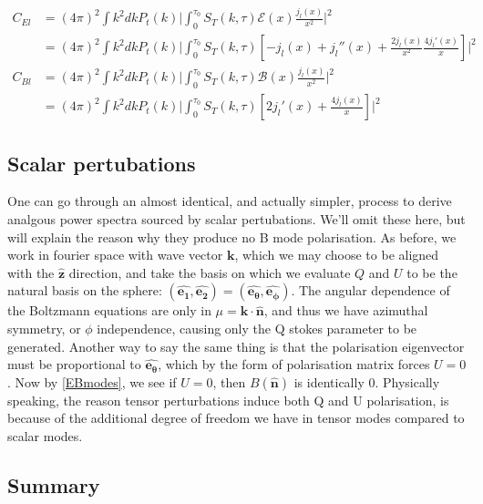 \documentclass[a4paper,11pt]{article}
\renewcommand{\v}[1]{\mathbf{#1}}
\newcommand{\unit}[1]{\hat{\v{#1}}}
\begin{document}
\begin{align}
C_{El} &= (4\pi)^2 \int k^2 dk P_t(k) \bigg|  \int_0^{\tau_0} S_T(k,\tau)\mathcal{E}(x)\frac{j_l(x)}{x^2} \bigg|^2\\
&= (4\pi)^2\int k^2 dk P_t(k) \bigg|  \int_0^{\tau_0} S_T(k,\tau)[-j_l(x) +j_l''(x)+\frac{2j_l(x)}{x^2} \frac{4j_l'(x)}{x}]\bigg|^2\\
C_{Bl} &= (4\pi)^2 \int k^2 dk P_t(k) \bigg|  \int_0^{\tau_0} S_T(k,\tau)\mathcal{B}(x)\frac{j_l(x)}{x^2} \bigg|^2\\
&= (4\pi)^2\int k^2 dk P_t(k) \bigg|  \int_0^{\tau_0} S_T(k,\tau)[2j_l'(x)+\frac{4j_l(x)}{x}]\bigg|^2
\end{align}


\subsection{Scalar pertubations}

One can go through an almost identical, and actually simpler, process to derive analgous power spectra sourced by scalar pertubations. We'll omit these here, but will explain the reason why they produce no B mode polarisation. As before, we work in fourier space with wave vector $\v{k}$, which we may choose to be aligned with the $\unit{z}$ direction, and take the basis on which we evaluate $Q$ and $U$ to be the natural basis on the sphere: $(\unit{e_1}, \unit{e_2}) = (\unit{e_\theta}, \unit{e_\phi})$. The angular dependence of the Boltzmann equations are only in $\mu=\v{k}\cdot\unit{n}$, and thus we have azimuthal symmetry, or $\phi$ independence, causing only the Q stokes parameter to be generated. Another way to say the same thing is that the polarisation eigenvector must be proportional to $\unit{e_\theta}$, which by the form of polarisation matrix forces $U=0$. Now by \ref{EBmodes}, we see if $U=0$, then $B(\unit{n})$ is identically 0. Physically speaking, the reason tensor perturbations induce both Q and U polarisation, is because of the additional degree of freedom we have in tensor modes compared to scalar modes.


\subsection{Summary}
\end{document}
